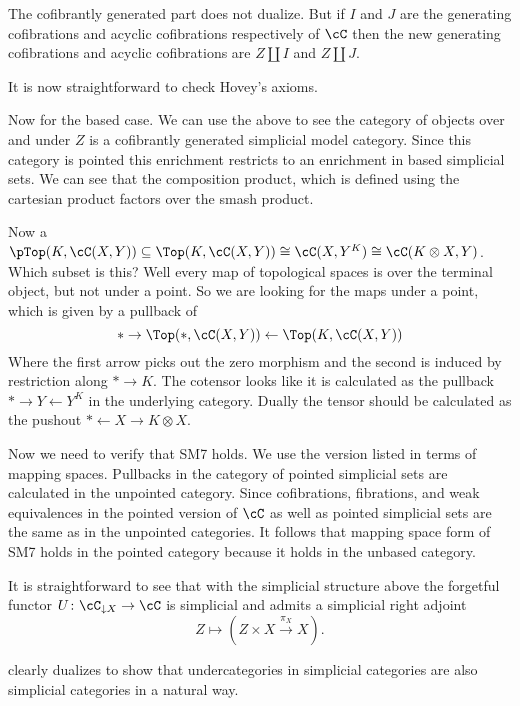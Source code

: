 \documentclass[leqno,oneside,english]{elsarticle}
\newcounter{enumisaved}
\newlength{\thmsaved}
\newlength{\thmnow}
\begin{document}
{{{{{{{The cofibrantly generated part does not dualize. But if $I$ and $J$ are
the generating cofibrations and acyclic cofibrations respectively of
$\cC$ then the new generating cofibrations and acyclic cofibrations are
$Z\coprod I$ and $Z\coprod J$.

It is now straightforward to check Hovey's axioms. 

Now for the based case. We can use the above to see the category of
objects over and under $Z$ is a cofibrantly generated simplicial model
category. Since this category is pointed this enrichment restricts to
an enrichment in based simplicial sets. We can see that the
composition product, which is defined using the cartesian product
factors over the smash product. 

Now a $\pTop(K,\cC(X,Y)) \subseteq \Top(K, \cC(X,Y))\cong \cC(X,Y^K)
\cong \cC(K\otimes X, Y)$.
Which subset is this? Well every map of topological spaces is over the
terminal object, but not under a point. So we are looking for the maps
under a point, which is given by a pullback  of
\[
* \to \Top(*, \cC(X,Y)) \leftarrow \Top(K, \cC(X,Y)) 
\]
Where the first arrow picks out the zero morphism and the second is
induced by restriction along $* \to K$.  The cotensor looks like it is
calculated as the pullback $* \to Y \leftarrow Y^K$ in the underlying category.
Dually the tensor should be calculated as the pushout $* \leftarrow X \to
K\otimes X$. 

Now we need to verify that SM7 holds. We use the version listed in
terms of mapping spaces. Pullbacks in the category of pointed
simplicial sets are calculated in the unpointed category.  Since
cofibrations, fibrations, and weak
equivalences in the pointed version of $\cC$ as well as pointed
simplicial sets are the same as in the unpointed categories. It
follows that mapping space form of SM7 holds in the pointed category
because it holds in the unbased category.

}}
\fi}}{}
It is straightforward to see that with the simplicial structure above
the forgetful functor $U\colon \cC_{\downarrow X}\rightarrow \cC$ is
simplicial and admits a simplicial right adjoint 
\[Z\mapsto (Z\times X\xrightarrow{\pi_{X}} X). \]

\begin{rmk*}
   clearly dualizes to show that
  undercategories in simplicial categories are also simplicial categories
  in a natural way.
\end{rmk*}

}
  {}
  \ 
  \ifthenelse{\lengthtest{\thmnow > \thmsaved}}{
    
    \setcounter{thm}{{\strip@pt{\thmsaved}}}  
  }{
    
  }
  \setcounter{enumi}{\theenumisaved}
    \else  \fi
}}{}
\end{document}

